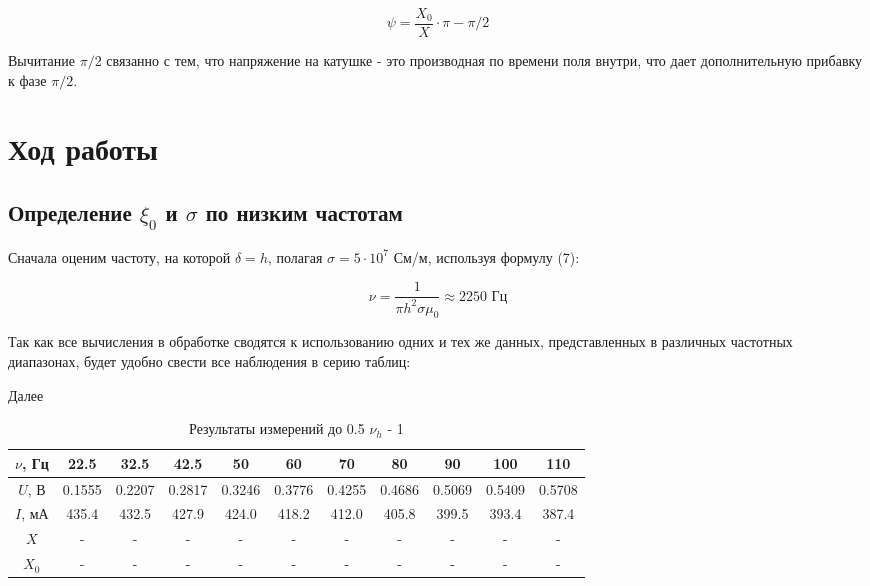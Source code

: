 \documentclass[a4paper,12pt]{article} %
\begin{document}
\begin{equation}
	\psi = \frac{X_0}{X} \cdot \pi - \pi/2
\end{equation}

Вычитание $\pi / 2$ связанно с тем, что напряжение на катушке - это производная по времени поля внутри, что дает дополнительную прибавку к фазе $\pi / 2$. 


\section{Ход работы}

\subsection{Определение $\xi_0$ и $\sigma$ по низким частотам}

Сначала оценим частоту, на которой $\delta = h$, полагая $\sigma = 5\cdot10^{7}$ См/м, используя формулу (7):

\begin{equation}
	\nu = \frac{1}{\pi h^2\sigma \mu_0} \approx 2250 \text{ Гц}
\end{equation}

Так как все вычисления в обработке сводятся к использованию одних и тех же данных, представленных в различных частотных диапазонах, будет удобно свести все наблюдения в серию таблиц:

Далее 

\begin{table}[H]
	\centering
	\begin{tabular}{|c|c|c|c|c|c|c|c|c|c|c|}
		\hline
		$ \nu $, Гц   & 22.5   & 32.5   & 42.5   & 50   & 60   & 70   & 80   & 90 & 100 & 110 \\ \hline
		$ U $, В & 0.1555 & 0.2207 & 0.2817 & 0.3246 & 0.3776 & 0.4255 & 0.4686 & 0.5069 & 0.5409 & 0.5708\\ \hline
		$ I $, мА & 435.4 & 432.5 & 427.9 & 424.0 & 418.2 & 412.0 & 405.8 & 399.5 & 393.4 & 387.4 \\ \hline
		$ X $  & - & - & - & - & - & - & - & - & - & - \\ \hline
		$ X_0 $  & - & - & - & - & - & - & - & - & - & - \\ \hline
	\end{tabular}
	\caption{Результаты измерений до 0.5 $\nu_h$ - 1}
	\label{tab:my-table1}
\end{table}
\end{document}
